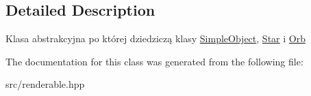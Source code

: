 \subsection{Detailed Description}
Klasa abstrakcyjna po której dziedziczą klasy \hyperlink{class_simple_object}{Simple\+Object}, \hyperlink{class_star}{Star} i \hyperlink{class_orb}{Orb} 

The documentation for this class was generated from the following file\+:\begin{DoxyCompactItemize}
\item 
src/renderable.\+hpp\end{DoxyCompactItemize}
